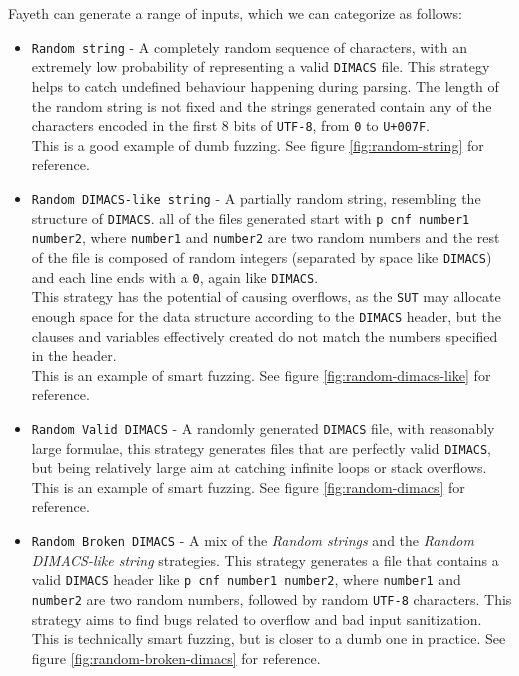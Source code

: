 \documentclass{article}
\begin{document}
Fayeth can generate a range of inputs, which we can categorize as follows:

\begin{itemize}

		\item \verb|Random string| - A completely random sequence of characters, with an extremely low probability of representing a valid \texttt{DIMACS} file. This strategy helps to catch undefined behaviour happening during parsing.
		The length of the random string is not fixed and the strings generated contain any of the characters encoded in the first 8 bits of \texttt{UTF-8}, from \texttt{0} to \texttt{U+007F}. \\
		This is a good example of dumb fuzzing.
		See figure \ref{fig:random-string} for reference.
		
		\item \verb|Random DIMACS-like string| - A partially random string, resembling the structure of \texttt{DIMACS}. all of the 
		files generated start with \texttt{p cnf number1 number2}, where \texttt{number1} and \texttt{number2} are two random numbers
		and the rest of the file is composed of random integers (separated by space like \texttt{DIMACS}) and each line ends with a \texttt{0}, again like \texttt{DIMACS}. \\
		This strategy has the potential of causing overflows, as the \texttt{SUT} may allocate enough space for the data structure according to the \texttt{DIMACS} header, but the clauses and variables effectively created do not match the numbers specified in the header.\\
		This is an example of smart fuzzing.
		See figure \ref{fig:random-dimacs-like} for reference.
		
		\item \verb|Random Valid DIMACS| - A randomly generated \texttt{DIMACS} file, with reasonably large formulae, this strategy generates files that are perfectly valid \texttt{DIMACS}, but being relatively large aim at catching infinite loops or stack overflows. \\
		This is an example of smart fuzzing.
		See figure \ref{fig:random-dimacs} for reference.
		
		\item \verb|Random Broken DIMACS| - A mix of the \emph{Random strings} and the \emph{Random DIMACS-like string} strategies.
		This strategy generates a file that contains a valid \texttt{DIMACS} header like \texttt{p cnf number1 number2}, where \texttt{number1} and \texttt{number2} are two random numbers, followed by random \texttt{UTF-8} characters.
		This strategy aims to find bugs related to overflow and bad input sanitization.  \\
		This is technically smart fuzzing, but is closer to a dumb one in practice.
		See figure \ref{fig:random-broken-dimacs} for reference.

\end{itemize}
\end{document}
